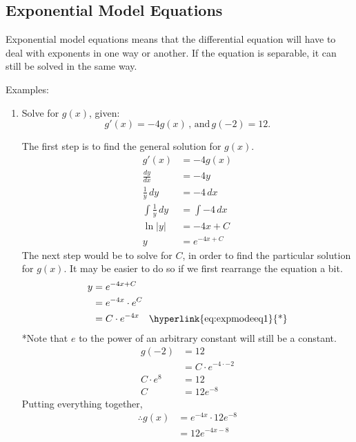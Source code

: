 \documentclass[12pt]{article}
\begin{document}
\subsection{Exponential Model Equations}
Exponential model equations means that the differential equation will have to deal with exponents in one way or another. If the equation is separable, it can still be solved in the same way.

\noindent Examples:
\begin{enumerate}
	\item Solve for $g(x)$, given:
	      \[ g'(x) = -4 g(x) \, \text{, and} \, g(-2) = 12. \]

	      The first step is to find the general solution for $g(x)$.
	      \begin{align*}
		      g'(x)                  & = -4 g(x)       \\
		      \frac{dy}{dx}          & = -4y           \\[6pt]
		      \frac{1}{y} \, dy      & = -4 \, dx      \\[6pt]
		      \int \frac{1}{y} \, dy & = \int -4 \, dx \\[6pt]
		      \ln|y|                 & = -4x + C       \\
		      y                      & = e^{-4x + C}
	      \end{align*}
	      The next step would be to solve for $C$, in order to find the particular solution for $g(x)$. It may be easier to do so if we first rearrange the equation a bit.
	      \begin{align*}
		      y & = e^{-4x + C}                                               \\
		      & = e^{-4x} \cdot e^C                                         \\
		      & = C \cdot e^{-4x} \quad \text{\hyperlink{eq:expmodeeq1}{*}}
	      \end{align*}
	      \hypertarget{eq:expmodeq1}{*}Note that $e$ to the power of an arbitrary constant will still be a constant.
	      \begin{align*}
		      g(-2)       & = 12                      \\
		      & = C \cdot e^{-4 \cdot -2} \\
		      C \cdot e^8 & = 12                      \\
		      C           & = 12 e^{-8}
	      \end{align*}
	      Putting everything together,
	      \begin{align*}
		      \therefore g(x) & = e^{-4x} \cdot 12 e^{-8} \\
		      & = 12 e^{-4x-8}
	      \end{align*}
	      \smallskip


\end{enumerate}
\end{document}
